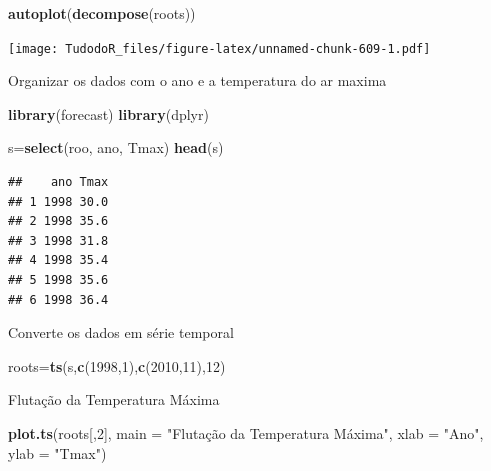 \documentclass[
]{book}
\newenvironment{Shaded}{\begin{snugshade}}{\end{snugshade}}
\newcommand{\DataTypeTok}[1]{\textcolor[rgb]{0.13,0.29,0.53}{#1}}
\newcommand{\DecValTok}[1]{\textcolor[rgb]{0.00,0.00,0.81}{#1}}
\newcommand{\KeywordTok}[1]{\textcolor[rgb]{0.13,0.29,0.53}{\textbf{#1}}}
\newcommand{\NormalTok}[1]{#1}
\newcommand{\StringTok}[1]{\textcolor[rgb]{0.31,0.60,0.02}{#1}}
\begin{document}
\begin{Shaded}
\begin{Highlighting}[]
\KeywordTok{autoplot}\NormalTok{(}\KeywordTok{decompose}\NormalTok{(roots))}
\end{Highlighting}
\end{Shaded}

\texttt{[image: TudodoR\_files/figure-latex/unnamed-chunk-609-1.pdf]}

Organizar os dados com o ano e a temperatura do ar maxima

\begin{Shaded}
\begin{Highlighting}[]
\KeywordTok{library}\NormalTok{(forecast)}
\KeywordTok{library}\NormalTok{(dplyr)}
\end{Highlighting}
\end{Shaded}

\begin{Shaded}
\begin{Highlighting}[]
\NormalTok{s=}\KeywordTok{select}\NormalTok{(roo, ano, Tmax)}
\KeywordTok{head}\NormalTok{(s)}
\end{Highlighting}
\end{Shaded}

\begin{verbatim}
##    ano Tmax
## 1 1998 30.0
## 2 1998 35.6
## 3 1998 31.8
## 4 1998 35.4
## 5 1998 35.6
## 6 1998 36.4
\end{verbatim}

Converte os dados em série temporal

\begin{Shaded}
\begin{Highlighting}[]
\NormalTok{roots=}\KeywordTok{ts}\NormalTok{(s,}\KeywordTok{c}\NormalTok{(}\DecValTok{1998}\NormalTok{,}\DecValTok{1}\NormalTok{),}\KeywordTok{c}\NormalTok{(}\DecValTok{2010}\NormalTok{,}\DecValTok{11}\NormalTok{),}\DecValTok{12}\NormalTok{)}
\end{Highlighting}
\end{Shaded}

Flutação da Temperatura Máxima

\begin{Shaded}
\begin{Highlighting}[]
\KeywordTok{plot.ts}\NormalTok{(roots[,}\DecValTok{2}\NormalTok{], }\DataTypeTok{main =} \StringTok{"Flutação da Temperatura Máxima"}\NormalTok{, }\DataTypeTok{xlab =} \StringTok{"Ano"}\NormalTok{, }\DataTypeTok{ylab =} \StringTok{"Tmax"}\NormalTok{)}
\end{Highlighting}
\end{Shaded}
\end{document}
